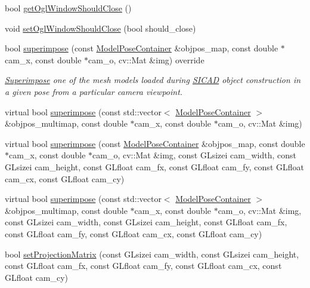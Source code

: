\begin{DoxyCompactItemize}
\item 
bool \mbox{\hyperlink{classSICAD_aaf003ab2ac8bc5ebdef6611ca1547e73}{get\+Ogl\+Window\+Should\+Close}} ()
\item 
void \mbox{\hyperlink{classSICAD_a0e42acab32252ddc878794f365ee1037}{set\+Ogl\+Window\+Should\+Close}} (bool should\+\_\+close)
\item 
bool \mbox{\hyperlink{classSICAD_a356e0ac8a0f130952a72326bedd4ab60}{superimpose}} (const \mbox{\hyperlink{classSuperimpose_a178e3d4e2def6635bfcf9454dd4b5d22}{Model\+Pose\+Container}} \&objpos\+\_\+map, const double $\ast$cam\+\_\+x, const double $\ast$cam\+\_\+o, cv\+::\+Mat \&img) override
\begin{DoxyCompactList}\small\item\em \mbox{\hyperlink{classSuperimpose}{Superimpose}} one of the mesh models loaded during \mbox{\hyperlink{classSICAD}{S\+I\+C\+AD}} object construction in a given pose from a particular camera viewpoint. \end{DoxyCompactList}\item 
virtual bool \mbox{\hyperlink{classSICAD_ab15f84cec5a65c8dd6cad85f9b0e1993}{superimpose}} (const std\+::vector$<$ \mbox{\hyperlink{classSuperimpose_a178e3d4e2def6635bfcf9454dd4b5d22}{Model\+Pose\+Container}} $>$ \&objpos\+\_\+multimap, const double $\ast$cam\+\_\+x, const double $\ast$cam\+\_\+o, cv\+::\+Mat \&img)
\item 
virtual bool \mbox{\hyperlink{classSICAD_af6c19a679de29992c5f9609f4424add0}{superimpose}} (const \mbox{\hyperlink{classSuperimpose_a178e3d4e2def6635bfcf9454dd4b5d22}{Model\+Pose\+Container}} \&objpos\+\_\+map, const double $\ast$cam\+\_\+x, const double $\ast$cam\+\_\+o, cv\+::\+Mat \&img, const G\+Lsizei cam\+\_\+width, const G\+Lsizei cam\+\_\+height, const G\+Lfloat cam\+\_\+fx, const G\+Lfloat cam\+\_\+fy, const G\+Lfloat cam\+\_\+cx, const G\+Lfloat cam\+\_\+cy)
\item 
virtual bool \mbox{\hyperlink{classSICAD_a269e238387393b44177daa4eae88fedd}{superimpose}} (const std\+::vector$<$ \mbox{\hyperlink{classSuperimpose_a178e3d4e2def6635bfcf9454dd4b5d22}{Model\+Pose\+Container}} $>$ \&objpos\+\_\+multimap, const double $\ast$cam\+\_\+x, const double $\ast$cam\+\_\+o, cv\+::\+Mat \&img, const G\+Lsizei cam\+\_\+width, const G\+Lsizei cam\+\_\+height, const G\+Lfloat cam\+\_\+fx, const G\+Lfloat cam\+\_\+fy, const G\+Lfloat cam\+\_\+cx, const G\+Lfloat cam\+\_\+cy)
\item 
bool \mbox{\hyperlink{classSICAD_a39cdff6871d32429d8ba95b776e0b874}{set\+Projection\+Matrix}} (const G\+Lsizei cam\+\_\+width, const G\+Lsizei cam\+\_\+height, const G\+Lfloat cam\+\_\+fx, const G\+Lfloat cam\+\_\+fy, const G\+Lfloat cam\+\_\+cx, const G\+Lfloat cam\+\_\+cy)

\end{DoxyCompactItemize}
